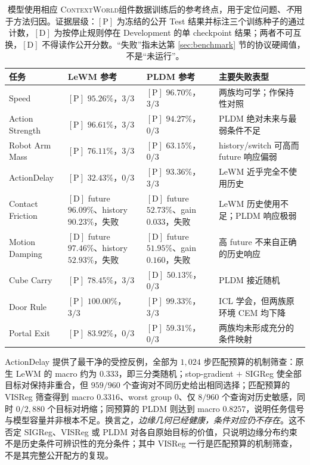 \documentclass[UTF8,zihao=-4,fontset=fandol]{ctexart}
\newcommand{\benchmark}{\textsc{ContextWorld}}
\begin{document}
\begin{table}[t]
\centering
\footnotesize
\caption{模型使用相应 \benchmark 组件数据训练后的参考终点，用于定位问题、\emph{不}用于方法归因。证据层级：$[\mathrm{P}]$ 为冻结的公开 Test 结果并标注三个训练种子的通过计数，$[\mathrm{D}]$ 为按停止规则停在 Development 的单 checkpoint 结果；两者不可互换，$[\mathrm{D}]$ 不得读作公开分数。“失败”指未达第 \ref{sec:benchmark} 节的协议硬阈值，不是“未运行”。}
\label{tab:baseline}
\begin{tabularx}{\textwidth}{@{}lp{3.5cm}p{3.5cm}Y@{}}
\toprule
任务 & LeWM 参考 & PLDM 参考 & 主要失败表型 \\
\midrule
Speed & $[\mathrm{P}]$ $95.26\%$，$3/3$ & $[\mathrm{P}]$ $96.70\%$，$3/3$ & 两族均可学；作保持性对照 \\
Action Strength & $[\mathrm{P}]$ $96.61\%$，$3/3$ & $[\mathrm{P}]$ $94.27\%$，$0/3$ & PLDM 绝对未来与最弱条件不足 \\
Robot Arm Mass & $[\mathrm{P}]$ $76.11\%$，$3/3$ & $[\mathrm{P}]$ $63.15\%$，$0/3$ & history/switch 可高而 future 响应偏弱 \\
ActionDelay & $[\mathrm{P}]$ $32.43\%$，$0/3$ & $[\mathrm{P}]$ $93.36\%$，$3/3$ & LeWM 近乎完全不使用历史 \\
Contact Friction & $[\mathrm{D}]$ future $96.09\%$、history $90.23\%$，失败 & $[\mathrm{D}]$ future $52.73\%$、gain $0.033$，失败 & LeWM 历史使用不足；PLDM 响应极弱 \\
Motion Damping & $[\mathrm{D}]$ future $97.46\%$、history $52.93\%$，失败 & $[\mathrm{D}]$ future $51.95\%$、gain $0.160$，失败 & 高 future 不来自正确的历史响应 \\
Cube Carry & $[\mathrm{P}]$ $78.45\%$，$3/3$ & $[\mathrm{D}]$ $50.13\%$，$0/3$ & PLDM 接近随机 \\
Door Rule & $[\mathrm{P}]$ $100.00\%$，$3/3$ & $[\mathrm{P}]$ $99.33\%$，$3/3$ & ICL 学会，但两族原环境 CEM 均下降 \\
Portal Exit & $[\mathrm{P}]$ $83.92\%$，$0/3$ & $[\mathrm{P}]$ $59.31\%$，$0/3$ & 两族均未形成充分的条件映射 \\
\bottomrule
\end{tabularx}
\end{table}

ActionDelay 提供了最干净的受控反例，全部为 $1{,}024$ 步匹配预算的机制筛查：原生 LeWM 的 macro 约为 $0.333$，即三分类随机；stop-gradient $+$ SIGReg 使全部目标对保持非重合，但 $959/960$ 个查询对不同历史给出相同选择；匹配预算的 VISReg 筛查得到 macro $0.3316$、worst group $0$、仅 $8/960$ 个查询对历史敏感，同时 $0/2{,}880$ 个目标对坍缩；同预算的 PLDM 则达到 macro $0.8257$，说明任务信号与模型容量并非根本不足。换言之，\emph{边缘几何已经健康，条件对应仍不存在}。这不否定 SIGReg、VISReg 或 PLDM 对各自原始目标的价值，只说明边缘分布约束不是历史条件可辨识性的充分条件；其中 VISReg 一行是匹配预算的机制筛查，不是其完整公开配方的复现。
\end{document}
